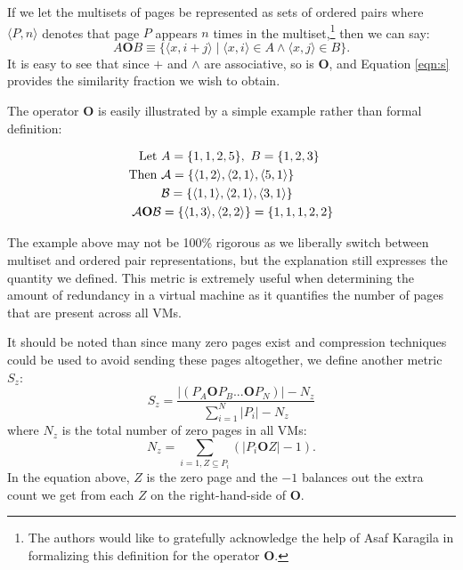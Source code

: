 \documentclass{acm_proc_article-sp}
\newcommand{\tup}[1]{\langle #1\rangle}
\begin{document}
If we let the multisets of pages be represented as sets of ordered pairs where $\tup{P,n}$ denotes that page $P$ appears $n$ times in the multiset,\footnote{The authors would like to gratefully acknowledge the help of Asaf Karagila in formalizing this definition for the operator $\mathbf{O}$.}
then we can say:
\begin{equation}\label{eqn:s}
A\mathrel{\mathbf{O}}B\equiv\{\tup{x,i+j}\mid\tup{x,i}\in A\land\tup{x,j}\in B\}.
\end{equation}
It is easy to see that since $+$ and $\land$ are associative, so is $\mathbf{O}$, and Equation \ref{eqn:s} provides the similarity fraction we wish to obtain.

The operator $\mathbf{O}$ is easily illustrated by a simple example rather than formal definition:

\begin{align*}
\textrm{Let } & A = \{1,1,2,5\},~B = \{1,2,3\}\\
\textrm{Then } &{\cal A} = \{\tup{1,2}, \tup{2,1}, \tup{5,1}\}\\
& {\cal B} = \{\tup{1,1}, \tup{2,1}, \tup{3,1}\}\\
{\cal A} \mathbf{O} {\cal B} &= \{\tup{1,3}, \tup{2,2}\} = \{1,1,1,2,2\}
\end{align*}

The example above may not be 100\% rigorous as we liberally switch between multiset and ordered pair representations, but the explanation still expresses the quantity we defined.  This metric is extremely useful when determining the amount of redundancy in a virtual machine as it quantifies the number of pages that are present across all VMs.

It should be noted than since many zero pages exist and compression techniques could be used to avoid sending these pages altogether\cite{live_adaptive_compress}, we define another metric $S_z$:
\begin{equation}
S_z = \frac{|(P_A \mathbf{O} P_B ... \mathbf{O} P_N)|-N_z}{\sum\limits_{i=1}^{N}|P_i|-N_z}
\end{equation}
where $N_z$ is the total number of zero pages in all VMs:
\begin{equation}
N_z = \sum\limits_{i=1,Z\subseteq P_i}\left(|P_i\mathbf{O}Z|-1\right).
\end{equation}\label{eqn:sz}
In the equation above, $Z$ is the zero page and the $-1$ balances out the extra count we get from each $Z$ on the right-hand-side of $\mathbf{O}$.
\end{document}
